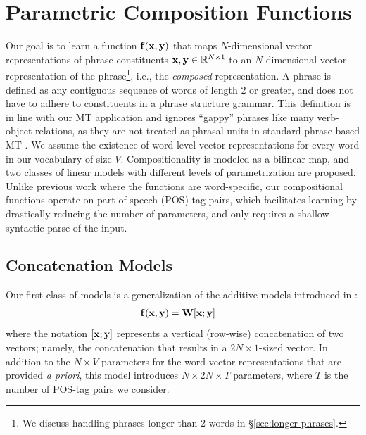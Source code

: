 \documentclass[11pt]{article}
\newcommand{\bX}{{\bf x}}
\newcommand{\bY}{{\bf y}}
\newcommand{\bF}{{\bf f}}
\newcommand{\bW}{{\bf W}}
\begin{document}
\section{Parametric Composition Functions}
\label{sec:learning}

Our goal is to learn a function $\bF (\bX, \bY)$ that maps $N$-dimensional vector representations of phrase constituents $\bX, \bY \in \mathbb{R}^{N \times 1}$  to an $N$-dimensional vector representation of the phrase\footnote{We discuss handling phrases longer than 2 words in \S\ref{sec:longer-phrases}.}, i.e., the \emph{composed} representation.
A phrase is defined as any contiguous sequence of words of length 2 or greater, and does not have to adhere to constituents in a phrase structure grammar. 
This definition is in line with our MT application and ignores ``gappy'' phrases like many verb-object relations, as they are not treated as phrasal units in standard phrase-based MT \cite{Koehn2003}.  
We assume the existence of word-level vector representations for every word in our vocabulary of size $V$.
Compositionality is modeled as a bilinear map, and two classes of linear models with different levels of parametrization are proposed.  
Unlike previous work \cite[\emph{inter alia}]{Baroni2010,Socher2013,Grefenstette2013} where the functions are  word-specific, our compositional functions operate on part-of-speech (POS) tag pairs, which facilitates learning by drastically reducing the number of parameters, and only requires a shallow syntactic parse of the input. 

\subsection{Concatenation Models}
\label{sec:concat}

Our first class of models is a generalization of the additive models introduced in :
\begin{align}
	\bF (\bX, \bY) &= \bW [\bX;\bY]
	\label{eq:concat}
\end{align}
where the notation $[\bX; \bY]$ represents a vertical (row-wise) concatenation of two vectors; namely, the concatenation that results in a $2N \times 1$-sized vector.  
In addition to the $N \times V$ parameters for the word vector representations that are provided \emph{a priori}, this model introduces $N \times 2N \times T$ parameters, where $T$ is the number of POS-tag pairs we consider.  
\end{document}
